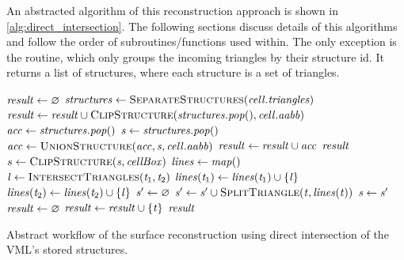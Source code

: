 An abstracted algorithm of this reconstruction approach is shown in \cref{alg:direct_intersection}.
The following sections discuss details of this algorithms and follow the order of subroutines/functions used within.
The only exception is the  routine, which only groups the incoming triangles by their structure id.
It returns a list of structures, where each structure is a set of triangles.

\begin{algorithm}
	\centering
	\begin{algorithmic}[1]
			\State $\mathit{result} \gets \varnothing$
					\State $\var{structures} \gets \Call{SeparateStructures}{\var{cell}.\var{triangles}}$
						\State $\var{result} \gets \var{result} \cup \Call{ClipStructure}{\var{structures}.\var{pop}(), \var{cell}.\var{aabb}}$
						\State $\mathit{acc} \gets \mathit{structures}.\mathit{pop}()$
							\State $\mathit{s} \gets \mathit{structures}.\mathit{pop}()$
							\State $\var{acc} \gets \Call{UnionStructure}{\var{acc}, \var{s}, \var{cell}.\var{aabb}}$
						\EndWhile
						\State $\mathit{result} \gets \mathit{result} \cup \mathit{acc}$
					\EndIf
				\EndIf
			\EndFor
			\State \Return $\mathit{result}$
		\EndFunction
		\\
				\State $s \gets \Call{ClipStructure}{\var{s}, \var{cellBox}}$
			\EndFor
			\State $\mathit{lines} \gets \mathit{map}()$ 
				\State $\var{l} \gets \Call{IntersectTriangles}{\var{t}_1, \var{t}_2}$
				 
					\State $\mathit{lines}(\mathit{t}_1) \gets \mathit{lines}(\mathit{t}_1) \cup \{\mathit{l}\}$
					\State $\mathit{lines}(\mathit{t}_2) \gets \mathit{lines}(\mathit{t}_2) \cup \{\mathit{l}\}$
				\EndIf
			\EndFor
				\State $\mathit{s'} \gets \varnothing$
					\State $\var{s'} \gets \var{s'} \cup \Call{SplitTriangle}{\var{t}, \var{lines}(\var{t})}$
				\EndFor
				\State $\mathit{s} \gets \mathit{s'}$
			\EndFor
			\State $\mathit{result} \gets \varnothing$
						\State $\mathit{result} \gets \mathit{result} \cup \{\mathit{t}\}$
					\EndIf
				\EndFor
			\EndFor
			\State \Return $\mathit{result}$
		\EndFunction
	\end{algorithmic}
	\caption{
		Abstract workflow of the surface reconstruction using direct intersection of the VML's stored structures.
	}
	\label{alg:direct_intersection}
\end{algorithm}


